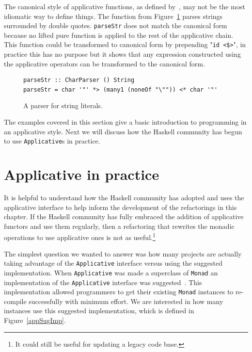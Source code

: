 The canonical style of applicative functions, as defined by~\citep{mcbrideIdioms}, may not be the most idiomatic way to define things. The function from Figure~\ref{strParse} parses strings surrounded by double quotes. \texttt{parseStr} does not match the canonical form because no lifted pure function is applied to the rest of the applicative chain. This function could be transformed to canonical form by prepending "\texttt{id <\$>}", in practice this has no purpose but it shows that any expression constructed using the applicative operators can be transformed to the canonical form.


\begin{figure}[t]
\begin{lstlisting}
parseStr :: CharParser () String 
parseStr = char '"' *> (many1 (noneOf "\"")) <* char '"'
\end{lstlisting}
\caption{A parser for string literals.}
\label{strParse}
\end{figure}


The examples covered in this section give a basic introduction to programming in an applicative style. Next we will discuss how the Haskell community has begun to use \texttt{Applicative}s in practice. 

\section{Applicative in practice}
\label{sec:appInPractice}

It is helpful to understand how the Haskell community has adopted and uses the applicative interface to help inform the development of the refactorings in this chapter. If the Haskell community has fully embraced the addition of applicative functors and use them regularly, then a refactoring that rewrites the monadic operations to use applicative ones is not as useful.\footnote{It could still be useful for updating a legacy code base.} 

The simplest question we wanted to answer was how many projects are actually taking advantage of the \texttt{Applicative} interface versus using the suggested implementation. When \texttt{Applicative} was made a superclass of \texttt{Monad} an implementation of the \texttt{Applicative} interface was suggested~\citep{applicativeProposal}. This implementation allowed programmers to get their existing \texttt{Monad} instances to re-compile successfully with minimum effort. We are interested in how many instances use this suggested implementation, which is defined in Figure~\ref{appSugImp}.


